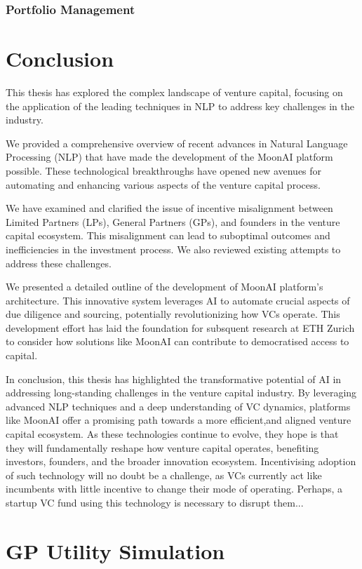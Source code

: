 \documentclass[a4paper, oneside]{discothesis}
\begin{document}
\subsection{Portfolio Management}

\chapter{Conclusion}

This thesis has explored the complex landscape of venture capital, focusing on the application of the leading techniques in NLP to address key challenges in the industry. 

We provided a comprehensive overview of recent advances in Natural Language Processing (NLP) that have made the development of the MoonAI platform possible. These technological breakthroughs have opened new avenues for automating and enhancing various aspects of the venture capital process.

We have examined and clarified the issue of incentive misalignment between Limited Partners (LPs), General Partners (GPs), and founders in the venture capital ecosystem. This misalignment can lead to suboptimal outcomes and inefficiencies in the investment process. We also reviewed existing attempts to address these challenges.

We presented a detailed outline of the development of MoonAI platform's architecture. This innovative system leverages AI to automate crucial aspects of due diligence and sourcing, potentially revolutionizing how VCs operate. This development effort has laid the foundation for subsquent research at ETH Zurich to consider how solutions like MoonAI can contribute to democratised access to capital. 

In conclusion, this thesis has highlighted the transformative potential of AI in addressing long-standing challenges in the venture capital industry. By leveraging advanced NLP techniques and a deep understanding of VC dynamics, platforms like MoonAI offer a promising path towards a more efficient,and aligned venture capital ecosystem. As these technologies continue to evolve, they hope is that they will fundamentally reshape how venture capital operates, benefiting investors, founders, and the broader innovation ecosystem. Incentivising adoption of such technology will no doubt be a challenge, as VCs currently act like incumbents with little incentive to change their mode of operating. Perhaps, a startup VC fund using this technology is necessary to disrupt them...





\appendix
\chapter{GP Utility Simulation}
\end{document}
